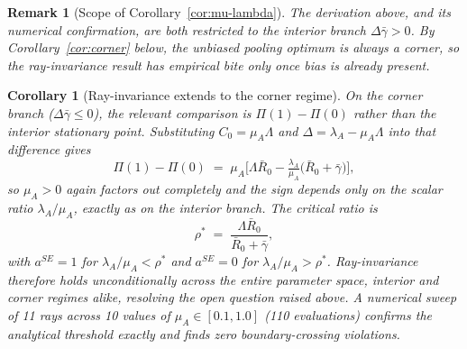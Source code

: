 \documentclass[11pt]{article}
\newtheorem{corollary}{Corollary}
\newtheorem{remark}{Remark}
\begin{document}
\begin{remark}[Scope of Corollary~\ref{cor:mu-lambda}]
The derivation above, and its numerical confirmation, are both restricted to the
interior branch $\Delta\bar\gamma>0$. By Corollary~\ref{cor:corner} below, the
\emph{unbiased} pooling optimum is always a corner, so the ray-invariance result
has empirical bite only once bias is already present.
\end{remark}

\begin{corollary}[Ray-invariance extends to the corner regime]\label{cor:corner-ray}
On the corner branch ($\Delta\bar\gamma\le 0$), the relevant comparison is
$\Pi(1)-\Pi(0)$ rather than the interior stationary point. Substituting
$C_0=\mu_A\Lambda$ and $\Delta=\lambda_A-\mu_A\Lambda$ into that difference gives
\[
\Pi(1)-\Pi(0) \;=\; \mu_A\Big[\Lambda\bar R_0 - \tfrac{\lambda_A}{\mu_A}\big(\bar
R_0+\bar\gamma\big)\Big],
\]
so $\mu_A>0$ again factors out completely and the sign depends only on the
scalar ratio $\lambda_A/\mu_A$, exactly as on the interior branch. The critical
ratio is
\[
\rho^{*} \;=\; \frac{\Lambda\bar R_0}{\bar R_0+\bar\gamma},
\]
with $a^{SE}=1$ for $\lambda_A/\mu_A<\rho^{*}$ and $a^{SE}=0$ for
$\lambda_A/\mu_A>\rho^{*}$. Ray-invariance therefore holds unconditionally
across the entire parameter space, interior and corner regimes alike,
resolving the open question raised above. A numerical sweep of 11 rays across
10 values of $\mu_A\in[0.1,1.0]$ (110 evaluations) confirms the analytical
threshold exactly and finds zero boundary-crossing violations.
\end{corollary}
\end{document}
